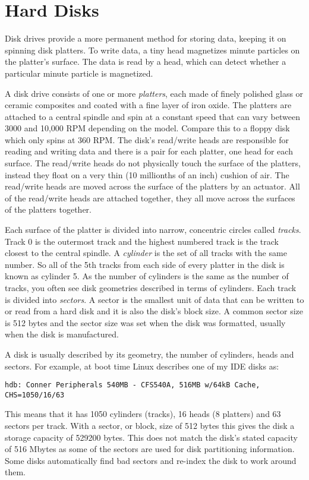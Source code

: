 \section{Hard Disks}
Disk drives provide a more permanent method for storing data, keeping it on spinning disk platters.
To write data, a tiny head magnetizes minute particles on the platter's surface.
The data is read by a head, which can detect whether a particular minute particle is magnetized.

A disk drive consists of one or more {\em platters}, each made of finely polished glass or ceramic
composites and coated with a fine layer of iron oxide.
The platters are attached to a central spindle and spin at a constant speed that can vary between
3000 and 10,000 RPM depending on the model.
Compare this to a floppy disk which only spins at 360 RPM.
The disk's read/write heads are responsible for reading and writing data and there is a pair for
each platter, one head for each surface.
The read/write heads do not physically touch the surface of the platters, instead they float  on
a very thin (10 millionths of an inch) cushion of air.
The read/write heads are moved across the surface of the platters by an actuator.
All of the read/write heads are attached together, they all move across the surfaces of the 
platters together. 

Each surface of the platter is divided into narrow, concentric circles called {\em tracks}.
Track 0 is the outermost track and the highest numbered track is the track closest to the
central spindle.
A {\em cylinder} is the set of all tracks with the same number.
So all of the 5th tracks from each side of every platter in the disk is known as cylinder 5.
As the number of cylinders is the same as the number of tracks, you often see disk geometries
described in terms of cylinders.
Each track is divided into {\em sectors}.
A sector is the smallest unit of data that can be written to or read from
a hard disk and it is also the disk's block
size.
A common sector size is 512 bytes and the sector size was set when the disk was formatted, usually
when the disk is manufactured.

A disk is usually described by its geometry, the number of cylinders, heads and sectors.
For example, at boot time Linux describes one of my IDE disks as:
\begin{verbatim}
hdb: Conner Peripherals 540MB - CFS540A, 516MB w/64kB Cache, CHS=1050/16/63
\end{verbatim}
This means that it has 1050 cylinders (tracks), 16 heads (8 platters) and 63 sectors per 
track.
With a sector, or block, size of 512 bytes this gives the disk a storage capacity of 529200 bytes.
This does not match the disk's stated capacity of 516 Mbytes as some of the sectors are used for
disk partitioning information.
Some disks automatically find bad sectors and re-index the disk to work around them.

